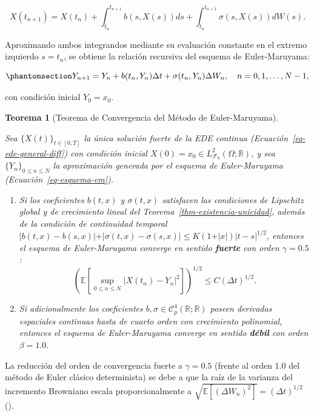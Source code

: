 \documentclass[
  spanish,
  us-letterpaper,
]{scrreprt}
\providecommand{\tightlist}{%
  \setlength{\itemsep}{0pt}\setlength{\parskip}{0pt}}
\numberwithin{equation}{section}
\theoremstyle{plain}
\newtheorem{theorem}{Teorema}[chapter]
\theoremstyle{plain}
\theoremstyle{plain}
\theoremstyle{definition}
\theoremstyle{remark}
\begin{document}
\[
X(t_{n+1}) = X(t_n) + \int_{t_n}^{t_{n+1}} b(s, X(s)) ds + \int_{t_n}^{t_{n+1}} \sigma(s, X(s)) dW(s).
\]

Aproximando ambos integrandos mediante su evaluación constante en el
extremo izquierdo \(s = t_n\), se obtiene la relación recursiva del
esquema de Euler-Maruyama:

\begin{equation}\phantomsection\label{eq-esquema-em}{
Y_{n+1} = Y_n + b(t_n, Y_n) \Delta t + \sigma(t_n, Y_n) \Delta W_n, \quad n = 0, 1, \dots, N - 1,
}\end{equation}

con condición inicial \(Y_0 = x_0\).

\begin{theorem}[Teorema de Convergencia del Método de
Euler-Maruyama]\protect\hypertarget{thm-euler-maruyama}{}\label{thm-euler-maruyama}

Sea \(\{X(t)\}_{t \in [0, T]}\) la única solución fuerte de la EDE
continua (Ecuación~\ref{eq-ede-general-diff}) con condición inicial
\(X(0) = x_0 \in L^2_{\mathcal{F}_0}(\Omega; \mathbb{R})\), y sea
\(\{Y_n\}_{0 \le n \le N}\) la aproximación generada por el esquema de
Euler-Maruyama (Ecuación~\ref{eq-esquema-em}).

\begin{enumerate}
\def\labelenumi{\arabic{enumi}.}
\tightlist
\item
  Si los coeficientes \(b(t, x)\) y \(\sigma(t, x)\) satisfacen las
  condiciones de Lipschitz global y de crecimiento lineal del
  Teorema~\ref{thm-existencia-unicidad}, además de la condición de
  continuidad temporal
  \(\vert b(t, x) - b(s, x) \vert + \vert \sigma(t, x) - \sigma(s, x) \vert \le K(1 + \vert x \vert)\vert t - s \vert^{1/2}\),
  entonces el esquema de Euler-Maruyama converge en sentido
  \textbf{fuerte} con orden \(\gamma = 0.5\): \[
  \left( \mathbb{E}\left[ \sup_{0 \le n \le N} \vert X(t_n) - Y_n \vert^2 \right] \right)^{1/2} \le C (\Delta t)^{1/2}.
  \]
\item
  Si adicionalmente los coeficientes
  \(b, \sigma \in \mathcal{C}_p^{4}(\mathbb{R}; \mathbb{R})\) poseen
  derivadas espaciales continuas hasta de cuarto orden con crecimiento
  polinomial, entonces el esquema de Euler-Maruyama converge en sentido
  \textbf{débil} con orden \(\beta = 1.0\).
\end{enumerate}

\end{theorem}

La reducción del orden de convergencia fuerte a \(\gamma = 0.5\) (frente
al orden \(1.0\) del método de Euler clásico determinista) se debe a que
la raíz de la varianza del incremento Browniano escala proporcionalmente
a \(\sqrt{\mathbb{E}[(\Delta W_n)^2]} = (\Delta t)^{1/2}\)
().
\end{document}
